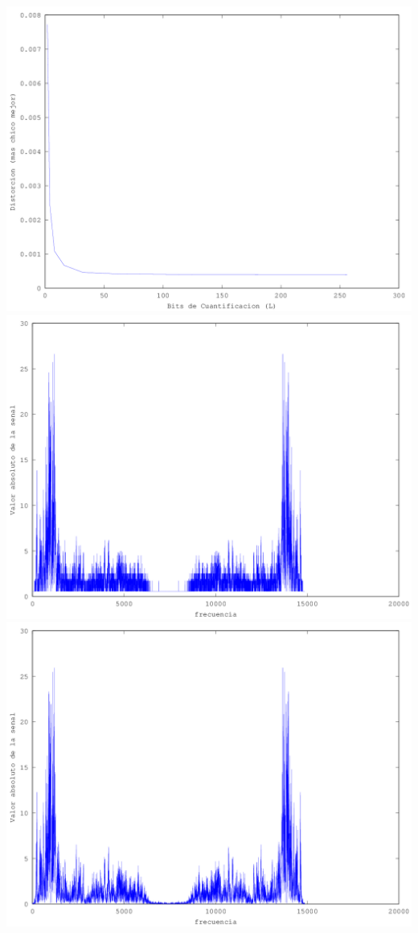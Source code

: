 \documentclass[a4paper,11pt]{article}
\begin{document}
\includegraphics[scale=0.8]{distorcion_media_fixed_epsilon.png}
\includegraphics[scale=0.8]{signal_with_compression.png}
\includegraphics[scale=0.8]{signal_without_compression.png}
\end{document}
